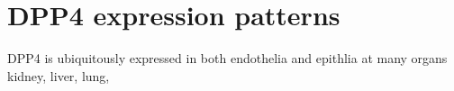 \section{DPP4 expression patterns}
DPP4 is ubiquitously expressed in both endothelia and epithlia at many organs kidney, liver, lung, 